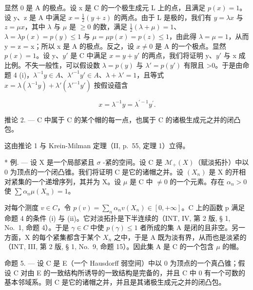 显然 0 是 A 的极点。设 x 是 C 的一个极生成元 L 上的点，且满足 \(p(x) = 1\)。设 y、z 是 A 中满足 \(x = \frac{1}{2}(y + z)\) 的两点。由于 L 是极的，我们有 \(y = \lambda x\) 与 \(z = \mu x\)，其中 \(\lambda\) 与 \(\mu\) 是 \(\geqslant 0\) 的数，满足 \(\frac{1}{2}(\lambda + \mu) = 1\)、\(\lambda = \lambda p(x) = p(y) \leqslant 1\) 与 \(\mu = \mu p(x) = p(z) \leqslant 1\)，由此得 \(\lambda = \mu = 1\)，从而 y = z = x；所以 x 是 A 的极点。反之，设 \(x \neq 0\) 是 A 的一个极点。显然 \(p(x) = 1\)。设 y、\(y'\) 是 C 中满足 \(x = y + y'\) 的两点，我们将证明 y、\(y'\) 与 x 成比例。不失一般性，可以假设数 \(\lambda = p(y)\) 与 \(\lambda' = p(y')\) 有限且 \textgreater0。于是由命题 4 (i)，\(\lambda^{-1}y \in A\)、\(\lambda'^{-1}y' \in A\)、\(\lambda + \lambda' = 1\)，且等式 \(x = \lambda(\lambda^{-1}y) + \lambda'(\lambda'^{-1}y')\) 按假设蕴含

\[
x = \lambda^ {- 1} y = \lambda^ {\prime - 1} y ^ {\prime}.
\]

推论 2. --- C 中属于 C 的某个帽的每一点，也属于 C 的诸极生成元之并的闭凸包。

这由推论 1 与 Krein-Milman 定理（II, p.~55, 定理 1）立得。

* 例. --- 设 X 是一个局部紧且 \(\sigma\) -紧的空间。设 C 是 \(\mathcal{M}_{+}(X)\)（赋淡拓扑）中以 0 为顶点的一个闭凸锥。我们将证明 C 是它的诸帽之并。设 \((X_{n})\) 是 X 的开相对紧集的一个递增序列，其并为 X。设 \(\mu\) 是 C 中 \(\neq 0\) 的一个元素。存在 \(\alpha_{n} > 0\) 使 \(\sum \alpha_{n}\mu(X_{n}) = 1\)。

对每个测度 \(v \in C\)，令 \(p(v) = \sum_{n} \alpha_{n} v(X_{n}) \in [0, +\infty]\)。C 上的函数 p 满足命题 4 的条件 (i) 与 (ii)。它对淡拓扑是下半连续的（INT, IV, 第 2 版, § 1, No.~1, 命题 4）。于是 \(\gamma \in C\) 中使 \(p(\gamma) \leqslant 1\) 者所成的集 A 是闭的且非空。另一方面，X 的每个紧集都含于某个 \(X_{n}\) 之中，于是 A 既为淡有界，从而也是淡紧的（INT, III, 第 2 版, § 1, No.~9, 命题 15）。因此集 A 是 C 的一个包含 \(\mu\) 的帽。

命题 5. --- 设 C 是 E（一个 Hausdorff 弱空间）中以 0 为顶点的一个真凸锥；假设 C 对由 E 的一致结构所诱导的一致结构是完备的，并且 C 中 0 有一个可数的基本邻域系。则 C 是它的诸帽之并，并且是其诸极生成元之并的闭凸包。

